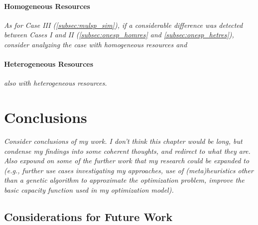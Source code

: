 \documentclass[12pt,dvipsnames]{report}
\begin{document}
\subsubsection{Homogeneous Resources} \label{subsubsec:mulsp_spec_homres}

\textit{As for Case III (\ref{subsec:mulsp_sim}), if a considerable difference was detected between Cases I and II (\ref{subsec:onesp_homres} and \ref{subsec:onesp_hetres}), consider analyzing the case with homogeneous resources and}

\subsubsection{Heterogeneous Resources} \label{subsubsec:mulsp_spec_hetres}

\textit{also with heterogeneous resources.}
\fi

\iftrue
\pagebreak
\chapter{Conclusions} \label{ch:conc}

%
\textit{Consider conclusions of my work.  I don't think this chapter would be long, but condense my findings into some coherent thoughts, and redirect to what they are.  Also expound on some of the further work that my research could be expanded to (e.g., further use cases investigating my approaches, use of (meta)heuristics other than a genetic algorithm to approximate the optimization problem, improve the basic capacity function used in my optimization model).}

\section{Considerations for Future Work} \label{sec:futurework}

\end{document}
